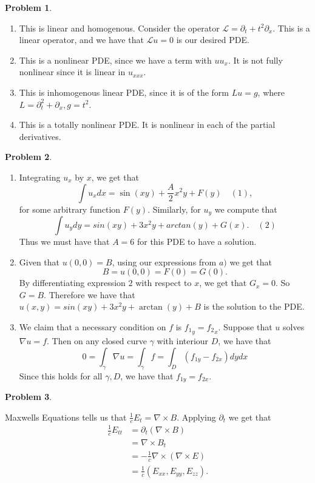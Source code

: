 \documentclass[12pt, a4paper]{article}
\title{}
\author{A.N.}
\date{\today}
\newtheorem{problem}{Problem}
\theoremstyle{definition}
\newcommand{\penum}{ \begin{enumerate}[label=\bf(\alph*), leftmargin=0pt]}
\newcommand{\epenum}{ \end{enumerate} }
\newcommand{\grad}{\nabla}
\begin{document}
\begin{problem}
\end{problem}
\penum
\item This is linear and homogenous. Consider the operator $\mathcal{L}= \partial_t + t^2 \partial_x $. This is a linear operator, and we have that $\mathcal{L}u=0$ is our desired PDE. 
\item This is a nonlinear PDE, since we have a term with $uu_x$. It is not fully nonlinear since it is linear in $u_{xxx}$. 
\item This is inhomogenous linear PDE, since it is of the form $Lu=g$, where $L = \partial_t^2 + \partial_x, g=t^2$.  
\item This is a totally nonlinear PDE. It is nonlinear in each of the partial derivatives. 
\epenum
 \newpage 
\begin{problem}
\end{problem}
\penum
\item Integrating $u_x$ by $x$, we get that $$\int u_x dx = \sin(xy) + \frac{A}{2} x^2y + F(y) \quad (1),$$ for some arbitrary function $F(y)$.
	Similarly, for $u_y$ we compute that $$ \int u_ydy = sin(xy) + 3x^2y + arctan(y) + G(x). \quad (2)$$
Thus we must have that $A=6$ for this PDE to have a solution. 
\item Given that $u(0,0) = B$, using our expressions from $a)$ we get that $$B = u(0,0) = F(0) = G(0).$$
By differentiating expression $2$ with respect to $x$, we get that $G_x=0$. So $G=B$. Therefore we have that $u(x,y) = sin(xy)+3x^2y+\arctan(y)+B$ is the solution to the PDE. 
\item We claim that a necessary condition on $f$ is ${f_1}_y ={f_2}_x$. Suppose that $u$ solves $\grad u = f$. 
Then on any closed curve $\gamma$ with interiour $D$, we have that $$0 = \int_\gamma \grad u = \int_\gamma f = \int_D (f_{1y} - f_{2x}) dy dx $$
Since this holds for all $\gamma, D$, we have that $f_{1y} = f_{2x}$. 
\epenum
\newpage 
\begin{problem}
\end{problem}
Maxwells Equations tells us that $\frac{1}{c} E_t = \grad \times B$. Applying $\partial_t$ we get that 
\begin{align*}\frac{1}{c} E_{tt} & = \partial_t(\grad \times B)
	\\& = \grad \times B_t \tag{since derivatives commute}
	\\& = - \frac{1}{c} \grad \times ( \grad \times E) \tag{Maxwells Equations}
	\\& =\frac{1}{c} (E_{xx},E_{yy}, E_{zz})\tag{Vector Calc identity for $\grad \cdot E=0$} .
\end{align*}
\end{document}
